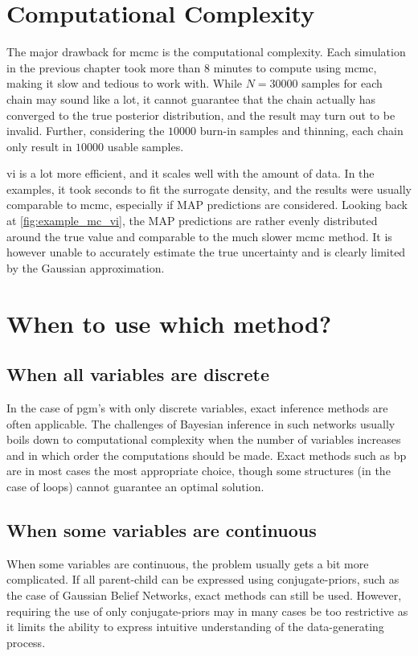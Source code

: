 \section{Computational Complexity}
The major drawback for \acrshort{mcmc} is the computational complexity. Each simulation in the previous chapter took more than 8 minutes to compute using \acrshort{mcmc}, making it slow and tedious to work with. While $N=30000$ samples for each chain may sound like a lot, it cannot guarantee that the chain actually has converged to the true posterior distribution, and the result may turn out to be invalid. Further, considering the $10000$ burn-in samples and thinning, each chain only result in $10000$ usable samples.

\acrshort{vi} is a lot more efficient, and it scales well with the amount of data. In the examples, it took seconds to fit the surrogate density, and the results were usually comparable to \acrshort{mcmc}, especially if MAP predictions are considered. Looking back at \cref{fig:example_mc_vi}, the MAP predictions are rather evenly distributed around the true value and comparable to the much slower \acrshort{mcmc} method. It is however unable to accurately estimate the true uncertainty and is clearly limited by the Gaussian approximation.    


\section{When to use which method?}

\subsection{When all variables are discrete}
In the case of \acrshort{pgm}'s with only discrete variables, exact inference methods are often applicable. The challenges of Bayesian inference in such networks usually boils down to computational complexity when the number of variables increases and in which order the computations should be made. Exact methods such as \acrshort{bp} are in most cases the most appropriate choice, though some structures (in the case of loops) cannot guarantee an optimal solution. 

\subsection{When some variables are continuous}
When some variables are continuous, the problem usually gets a bit more complicated. If all parent-child can be expressed using conjugate-priors, such as the case of Gaussian Belief Networks, exact methods can still be used. However, requiring the use of only conjugate-priors may in many cases be too restrictive as it limits the ability to express intuitive understanding of the data-generating process. 

